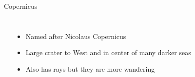 \documentclass[pdf, aspectratio=169]{beamer}
\begin{document}
\begin{frame}{Copernicus}
	\begin{columns}
		\begin{center}
		\end{center}
		
		\begin{itemize}
			\item Named after Nicolaus Copernicus
			\item Large crater to West and in center of many darker seas
			\item Also has rays but they are more wandering
		\end{itemize}
		
	\end{columns}
\end{frame}
\end{document}
